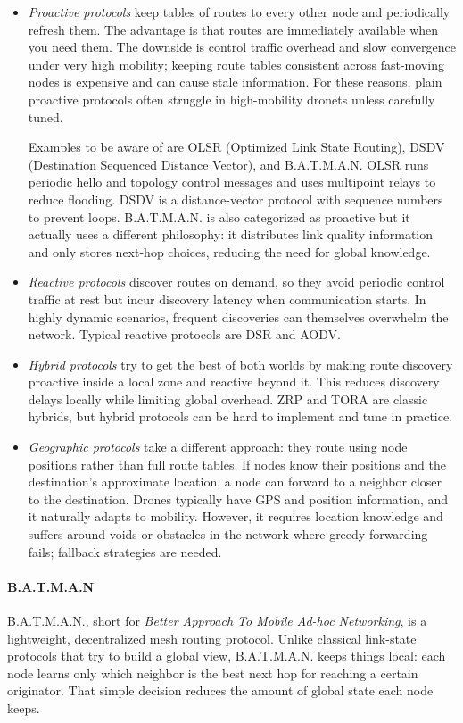 \begin{itemize}
    \item \textit{Proactive protocols} keep tables of routes to every other node and periodically refresh them. The advantage is that routes are immediately available when you need them. The downside is control traffic overhead and slow convergence under very high mobility; keeping route tables consistent across fast-moving nodes is expensive and can cause stale information. For these reasons, plain proactive protocols often struggle in high-mobility dronets unless carefully tuned.
    
    Examples to be aware of are OLSR (Optimized Link State Routing), DSDV (Destination Sequenced Distance Vector), and B.A.T.M.A.N. OLSR runs periodic hello and topology control messages and uses multipoint relays to reduce flooding. DSDV is a distance-vector protocol with sequence numbers to prevent loops. B.A.T.M.A.N. is also categorized as proactive but it actually uses a different philosophy: it distributes link quality information and only stores next-hop choices, reducing the need for global knowledge.
    \item \textit{Reactive protocols} discover routes on demand, so they avoid periodic control traffic at rest but incur discovery latency when communication starts. In highly dynamic scenarios, frequent discoveries can themselves overwhelm the network. Typical reactive protocols are DSR and AODV.
    \item \textit{Hybrid protocols} try to get the best of both worlds by making route discovery proactive inside a local zone and reactive beyond it. This reduces discovery delays locally while limiting global overhead. ZRP and TORA are classic hybrids, but hybrid protocols can be hard to implement and tune in practice.
    \item \textit{Geographic protocols} take a different approach: they route using node positions rather than full route tables. If nodes know their positions and the destination’s approximate location, a node can forward to a neighbor closer to the destination. Drones typically have GPS and position information, and it naturally adapts to mobility. However, it requires location knowledge and suffers around voids or obstacles in the network where greedy forwarding fails; fallback strategies are needed.
\end{itemize}

\paragraph{B.A.T.M.A.N}
B.A.T.M.A.N., short for \textit{Better Approach To Mobile Ad-hoc Networking}, is a lightweight, decentralized mesh routing protocol. Unlike classical link-state protocols that try to build a global view, B.A.T.M.A.N. keeps things local: each node learns only which neighbor is the best next hop for reaching a certain originator. That simple decision reduces the amount of global state each node keeps.
    
